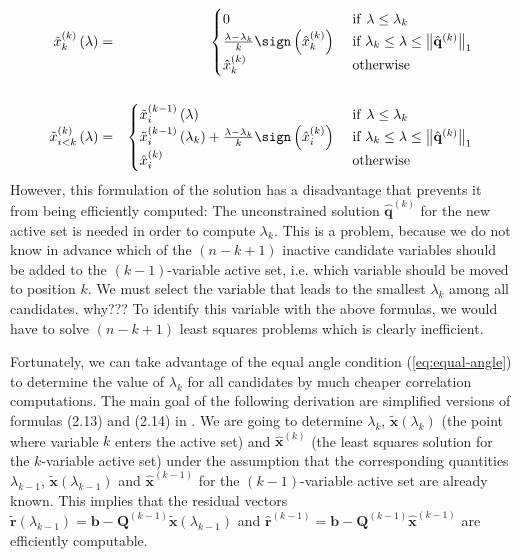 \begin{eqnarray}
\tilde{x}_{k}^{(k)}\left(\lambda\right) & = & \begin{cases}
0 & \mbox{\textrm{ if }}\lambda\le\lambda_{k}\\
\frac{\lambda-\lambda_{k}}{k}\sign\left(\hat{x}_{k}^{(k)}\right) & \mbox{ if }\lambda_{k}\le\lambda\le\left\Vert \hat{\mathbf{q}}^{(k)}\right\Vert _{1}\\
\hat{x}_{k}^{(k)} & \mbox{ otherwise}
\end{cases}\nonumber \\
\\
\tilde{x}_{i<k}^{(k)}\left(\lambda\right) & = & \begin{cases}
\tilde{x}_{i}^{(k-1)}\left(\lambda\right) & \mbox{\textrm{ if }}\lambda\le\lambda_{k}\\
\tilde{x}_{i}^{(k-1)}\left(\lambda_{k}\right)+\frac{\lambda-\lambda_{k}}{k}\sign\left(\hat{x}_{i}^{(k)}\right) & \mbox{ if }\lambda_{k}\le\lambda\le\left\Vert \hat{\mathbf{q}}^{(k)}\right\Vert _{1}\\
\hat{x}_{i}^{(k)} & \mbox{ otherwise}
\end{cases}\nonumber 
\end{eqnarray}
However, this formulation of the solution has a disadvantage that
prevents it from being efficiently computed: The unconstrained solution
$\hat{\mathbf{q}}^{(k)}$ for the new active set is needed in order
to compute $\lambda_{k}$. This is a problem, because we do not know
in advance which of the $\left(n-k+1\right)$ inactive candidate variables
should be added to the $(k-1)$-variable active set, i.e. which variable
should be moved to position $k$. We must select the variable that
leads to the smallest $\lambda_{k}$ among all candidates. why???
To identify this variable with the above formulas, we would have to
solve $\left(n-k+1\right)$ least squares problems which is clearly
inefficient. 


Fortunately, we can take advantage of the equal angle condition (\ref{eq:equal-angle})
to determine the value of $\lambda_{k}$ for all candidates by much
cheaper correlation computations. The main goal of the following derivation
are simplified versions of formulas (2.13) and (2.14) in \cite{efron-04-least}.
We are going to determine $\lambda_{k}$, $\tilde{\mathbf{x}}\left(\lambda_{k}\right)$
(the point where variable $k$ enters the active set) and $\hat{\mathbf{x}}^{(k)}$
(the least squares solution for the $k$-variable active set) under
the assumption that the corresponding quantities $\lambda_{k-1}$,
$\tilde{\mathbf{x}}\left(\lambda_{k-1}\right)$ and $\hat{\mathbf{x}}^{(k-1)}$
for the $\left(k-1\right)$-variable active set are already known.
This implies that the residual vectors $\tilde{\mathbf{r}}\left(\lambda_{k-1}\right)=\mathbf{b}-\mathbf{Q}^{(k-1)}\tilde{\mathbf{x}}\left(\lambda_{k-1}\right)$
and $\hat{\mathbf{r}}^{(k-1)}=\mathbf{b}-\mathbf{Q}^{(k-1)}\hat{\mathbf{x}}^{(k-1)}$
are efficiently computable. 



